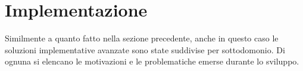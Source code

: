 
\section{Implementazione}\label{sec:implementazione}
%
Similmente a quanto fatto nella sezione precedente, anche in questo caso le soluzioni implementative avanzate sono state suddivise per sottodomonio. Di ognuna si elencano le motivazioni e le problematiche emerse durante lo sviluppo. 

